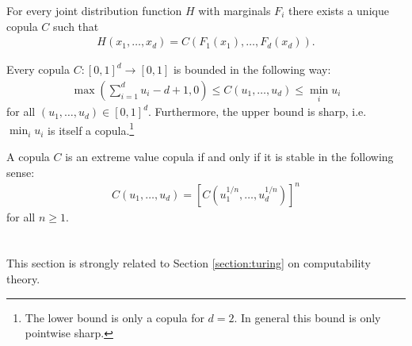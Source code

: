     \begin{theorem}[Sklar]
        For every joint distribution function $H$ with marginals $F_i$ there exists a unique copula $C$ such that
        \begin{gather}
            H(x_1,\ldots,x_d) = C(F_1(x_1),\ldots,F_d(x_d)).
        \end{gather}
    \end{theorem}

    \begin{property}
        Every copula $C:[0,1]^d\rightarrow[0,1]$ is bounded in the following way:
        \begin{gather}
            \max\left(\sum_{i=1}^du_i-d+1,0\right)\leq C(u_1,\ldots,u_d)\leq \min_iu_i
        \end{gather}
        for all $(u_1,\ldots,u_d)\in[0,1]^d$. Furthermore, the upper bound is sharp, i.e.\ $\min_iu_i$ is itself a copula.\footnote{The lower bound is only a copula for $d=2$. In general this bound is only pointwise sharp.}
    \end{property}

    \begin{property}
        A copula $C$ is an extreme value copula if and only if it is stable in the following sense:
        \begin{gather}
            C(u_1,\ldots,u_d) = \left[C(u_1^{1/n},\ldots,u_d^{1/n})\right]^n
        \end{gather}
        for all $n\geq1$.
    \end{property}

\section{}

    This section is strongly related to Section \ref{section:turing} on computability theory.



